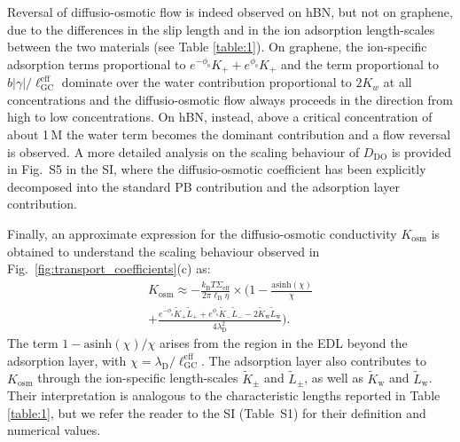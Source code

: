 \documentclass[journal=ancac3,manuscript=article,layout=twocolumn]{achemso}
\newcommand{\kt}{k_\text{B}T}
\newcommand{\lB}{\ell_\text{B}}
\newcommand{\debye}{\lambda_\text{D}}
\newcommand{\lGC}{\ell_\text{GC}}
\newcommand{\phis}{\phi_\text{s}}
\begin{document}
Reversal of diffusio-osmotic flow is
indeed observed on hBN,
but not on graphene, due to the
differences in the slip length and in the
ion adsorption length-scales between the two materials
(see Table \ref{table:1}).
On graphene,
the ion-specific adsorption terms
proportional to  $e^{-\phis}K_+ + e^{\phis}K_+$ and
the term proportional to $b|\gamma|/\lGC^{\text{eff}}$
dominate over the water contribution proportional to
$2K_w$ at all concentrations
and the diffusio-osmotic
flow always proceeds in the direction from high to low
concentrations. On hBN, instead, above a
critical concentration of about 1\,M
the water term becomes the dominant contribution
and a flow reversal is observed.
A more detailed analysis on the scaling behaviour
of $D_{\text{DO}}$ is provided in Fig.~S5
in the SI, where the diffusio-osmotic coefficient has been explicitly decomposed into the standard
PB contribution and the adsorption layer contribution.

Finally, an approximate expression for the diffusio-osmotic conductivity
$K_\mathrm{osm}$ is obtained to understand the scaling behaviour observed
in Fig.~\ref{fig:transport_coefficients}(c) as:
\begin{multline}
\label{eq:kosm_mGC}
    K_\mathrm{osm} \approx - \frac{\kt \Sigma_\text{eff}}{2 \pi \lB \eta} \times  \bigg ( 1  -\frac{\text{asinh} (\chi)} {\chi} \\
  + \frac{ e^{-\phis} \tilde{K}_+\tilde{L}_+   + e^{\phis} \tilde{K}_-\tilde{L}_-   -2 \tilde{K}_\text{w} \tilde{L}_\text{w}  }{4 \lambda_\mathrm D^2} \bigg ).
\end{multline}
The term $1-\text{asinh} (\chi)/\chi$
arises from the region in the EDL
beyond the adsorption layer,
with $\chi=\debye/\lGC^\text{eff}$\cite{Siria2013,Mouterde2018}.
The adsorption layer also contributes to
$K_{\text{osm}}$ through the ion-specific length-scales $\tilde{K}_{\pm}$ and $\tilde{L}_{\pm}$, as well as $\tilde{K}_\text{w}$ and $\tilde{L}_\text{w}$.
Their interpretation is
analogous to the characteristic lengths
reported in Table \ref{table:1},
but we refer the reader to the SI (Table~S1) for
their definition and numerical values.
\end{document}
